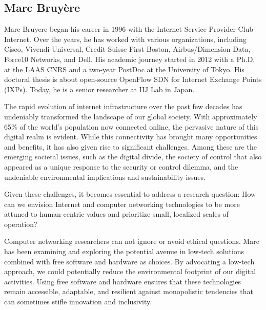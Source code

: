 \documentclass[conference]{IEEEtran}
\begin{document}
\subsection{Marc Bruyère}
Marc  Bruyere began  his  career  in 1996  with  the Internet  Service
Provider Club-Internet.  Over the  years, he  has worked  with various
organizations, including Cisco, Vivendi Universal, Credit Suisse First
Boston,  Airbus/Dimension  Data,  Force10   Networks,  and  Dell.  His
academic journey started in  2012 with a Ph.D. at the  LAAS CNRS and a
two-year PostDoc  at the University  of Tokyo. His doctoral  thesis is
about   open-source  OpenFlow   SDN  for   Internet  Exchange   Points
(IXPs). Today, he is a senior researcher at IIJ Lab in Japan.

The  rapid evolution  of  internet infrastructure  over  the past  few
decades  has  undeniably  transformed  the  landscape  of  our  global
society.  With  approximately  65\%  of  the  world’s  population  now
connected  online,  the pervasive  nature  of  this digital  realm  is
evident.  While  this connectivity has brought  many opportunities and
benefits,  it has  also given  rise to  significant challenges.  Among
these are  the emerging societal  issues, such as the  digital divide,
the society of control that also  appeared as a unique response to the
security  or   control  dilemma,  and  the   undeniable  environmental
implications and sustainability issues.

Given these  challenges, it  becomes essential  to address  a research
question:  How  can  we  envision  Internet  and  computer  networking
technologies to be more attuned to human-centric values and prioritize
small, localized scales of operation?

Computer  networking  researchers  can  not ignore  or  avoid  ethical
questions. Marc has been examining  and exploring the potential avenue
in  low-tech solutions  combined with  free software  and hardware  as
choices.  By  advocating a  low-tech  approach,  we could  potentially
reduce the  environmental footprint  of our digital  activities. Using
free  software and  hardware  ensures that  these technologies  remain
accessible, adaptable,  and resilient against  monopolistic tendencies
that can sometimes stifle innovation and inclusivity.


 
\end{document}
